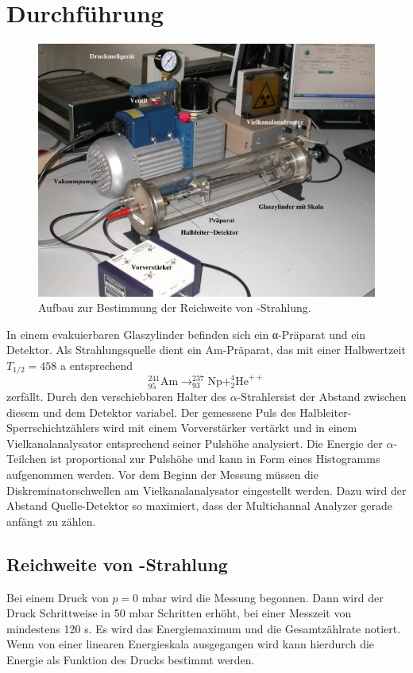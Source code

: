 \section{Durchführung}
\label{sec:Durchführung}

\begin{figure}
  \centering
  \includegraphics{data/abb1.png}
  \caption{Aufbau zur Bestimmung der Reichweite von \alpha-Strahlung.}
  \label{fig:abbA1}
\end{figure}
\FloatBarrier

In einem evakuierbaren Glaszylinder befinden sich ein α-Präparat und ein Detektor. 
Als Strahlungsquelle dient ein Am-Präparat, das mit einer Halbwertzeit $T_{1/2} = 458$ a entsprechend
\begin{equation}
    _{95}^{241}\text{Am} \longrightarrow _{93}^{237}\text{Np} + _{2}^{4}\text{He}^{++}
    \label{eqn:gl4}
\end{equation}
zerfällt.
Durch den verschiebbaren Halter des $\alpha$-Strahlersist der Abstand zwischen diesem und dem Detektor variabel.
Der gemessene Puls des Halbleiter-Sperrschichtzählers wird mit einem Vorverstärker vertärkt und in einem Vielkanalanalysator entsprechend seiner Pulshöhe analysiert.
Die Energie der $\alpha$-Teilchen ist proportional zur Pulshöhe und kann in Form eines Histogramms aufgenommen werden.
Vor dem Beginn der Messung müssen  die Diskreminatorschwellen am Vielkanalanalysator eingestellt werden.
Dazu wird der Abstand Quelle-Detektor so maximiert, dass der Multichannal Analyzer gerade anfängt zu zählen.

\subsection{Reichweite von \alpha-Strahlung}
Bei einem Druck von $p = 0$ mbar wird die Messung begonnen.
Dann wird der Druck Schrittweise in 50 mbar Schritten erhöht, bei einer Messzeit von mindestens 120 s.
Es wird das Energiemaximum und die Gesamtzählrate notiert.
Wenn von einer linearen Energieskala ausgegangen wird kann hierdurch die Energie als Funktion des Drucks bestimmt werden.
